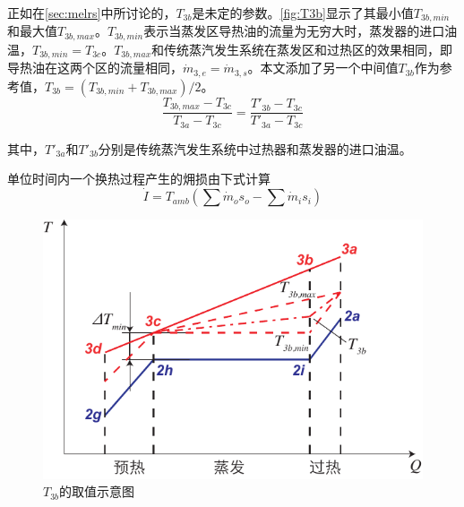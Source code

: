 正如在\autoref{sec:melrs}中所讨论的，$T_{3b}$是未定的参数。\autoref{fig:T3b}显示了其最小值$T_{3b,min}$和最大值$T_{3b,max}$。$T_{3b,min}$表示当蒸发区导热油的流量为无穷大时，蒸发器的进口油温，$T_{3b,min} = T_{3c}$。$T_{3b,max}$和传统蒸汽发生系统在蒸发区和过热区的效果相同，即导热油在这两个区的流量相同，$\dot{m}_{3,e} = \dot{m}_{3,s}$。本文添加了另一个中间值$T_{3b}$作为参考值，$T_{3b} = (T_{3b,min} + T_{3b,max}) / 2$。
\begin{equation}
  \dfrac{T_{3b,max}-T_{3c}}{T_{3a} - T_{3c}} = \dfrac{T'_{3b} - T_{3c}}{T'_{3a} - T_{3c}}
\end{equation}

其中，$T'_{3a}$和$T'_{3b}$分别是传统蒸汽发生系统中过热器和蒸发器的进口油温。

单位时间内一个换热过程产生的㶲损由下式计算
\begin{equation}
  \dot{I} = T_{amb} (\sum \dot{m}_os_o - \sum \dot{m}_is_i)
  \label{eq:dot_I}
\end{equation}

\noindent \begin{figure}[htbp]
\centering
	\includegraphics[width = 0.7\columnwidth]{fig/T3b}
	\caption{$T_{3b}$的取值示意图}
	\label{fig:T3b}
\end{figure}

